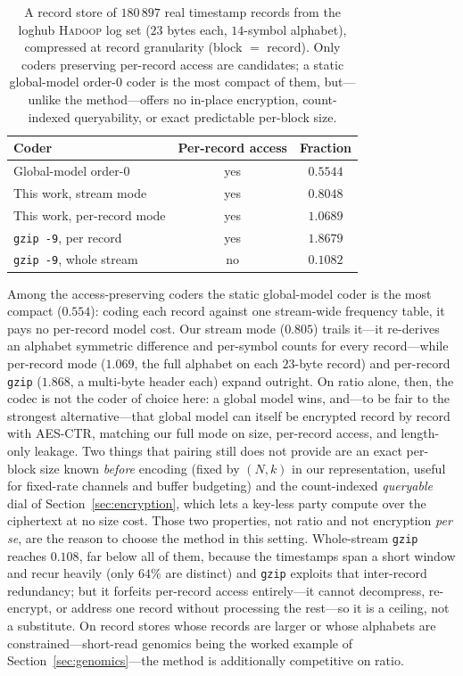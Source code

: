 \documentclass[entropy,article,submit,oneauthor,pdftex]{Definitions/mdpi}
\begin{document}
\begin{table}[ht]
\centering
\caption{A record store of $180\,897$ real timestamp records from the loghub
\textsc{Hadoop} log set ($23$ bytes each, $14$-symbol alphabet), compressed at record
granularity (block $=$ record). Only coders preserving per-record access are candidates;
a static global-model order-$0$ coder is the most compact of them, but---unlike the
method---offers no in-place encryption, count-indexed queryability, or exact predictable
per-block size.}
\begin{tabular}{l c c}
\toprule
\textbf{Coder} & \textbf{Per-record access} & \textbf{Fraction} \\
\midrule
Global-model order-$0$            & yes & $0.5544$ \\
This work, stream mode          & yes & $0.8048$ \\
This work, per-record mode      & yes & $1.0689$ \\
\texttt{gzip\,-9}, per record   & yes & $1.8679$ \\
\texttt{gzip\,-9}, whole stream & no  & $0.1082$ \\
\bottomrule
\end{tabular}
\label{tab:recordstore}
\end{table}

Among the access-preserving coders the static global-model coder is the most compact
($0.554$): coding each record against one stream-wide frequency table, it pays no
per-record model cost. Our stream mode ($0.805$) trails it---it re-derives an alphabet
symmetric difference and per-symbol counts for every record---while per-record mode
($1.069$, the full alphabet on each $23$-byte record) and per-record \texttt{gzip}
($1.868$, a multi-byte header each) expand outright. On ratio alone, then, the codec is
not the coder of choice here: a global model wins, and---to be fair to the strongest
alternative---that global model can itself be encrypted record by record with AES-CTR,
matching our full mode on size, per-record access, and length-only leakage. Two things that
pairing still does not provide are an exact per-block size known \emph{before} encoding
(fixed by $(N,k)$ in our representation, useful for fixed-rate channels and buffer
budgeting) and the count-indexed \emph{queryable} dial of Section~\ref{sec:encryption},
which lets a key-less party compute over the ciphertext at no size cost. Those two
properties, not ratio and not encryption \emph{per se}, are the reason to choose the method
in this setting. Whole-stream \texttt{gzip} reaches $0.108$, far below
all of them, because the timestamps span a short window and recur heavily (only $64\%$ are
distinct) and \texttt{gzip} exploits that inter-record redundancy; but it forfeits
per-record access entirely---it cannot decompress, re-encrypt, or address one record
without processing the rest---so it is a ceiling, not a substitute. On
record stores whose records are larger or whose alphabets are constrained---short-read
genomics being the worked example of Section~\ref{sec:genomics}---the method is
additionally competitive on ratio.
\end{document}
